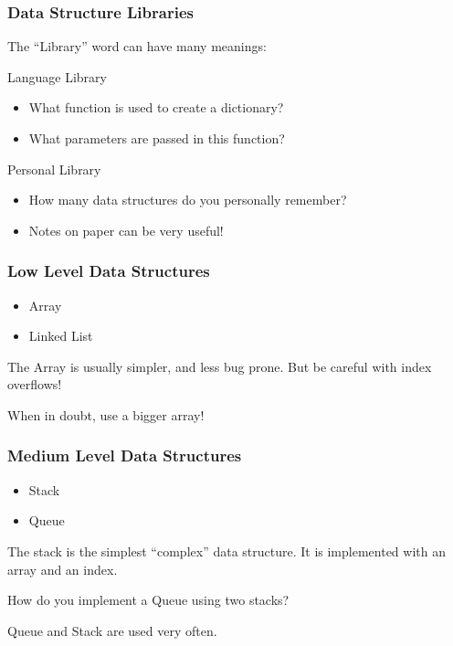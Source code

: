 \documentclass{beamer}
\begin{document}
\begin{frame}
  \frametitle{Data Structure Libraries}

  The ``Library'' word can have many meanings:

  \begin{block}{Language Library}
    \begin{itemize}
    \item What function is used to create a dictionary?
    \item What parameters are passed in this function?
    \end{itemize}
  \end{block}

  \begin{block}{Personal Library}
    \begin{itemize}
    \item How many data structures do you personally remember?
    \item Notes on paper can be very useful!
    \end{itemize}
  \end{block}
\end{frame}

\begin{frame}
  \frametitle{Low Level Data Structures}
  \begin{itemize}
  \item Array
    \vspace{.5cm}
  \item Linked List
  \end{itemize}
  
  \bigskip

  \begin{block}{}
    The Array is usually simpler, and less bug prone. But be careful with
    index overflows!
    \medskip
    
    When in doubt, use a bigger array!
  \end{block}
\end{frame}

\begin{frame}
  \frametitle{Medium Level Data Structures}
  \begin{itemize}
  \item Stack
    \vspace{.5cm}
  \item Queue
  \end{itemize}

  \bigskip

  \begin{block}{}
    The stack is the simplest ``complex'' data structure. It is
    implemented with an array and an index.
    \medskip
    
    How do you implement a Queue using two stacks?
    \medskip

    Queue and Stack are used very often.
  \end{block}
\end{frame}
\end{document}
